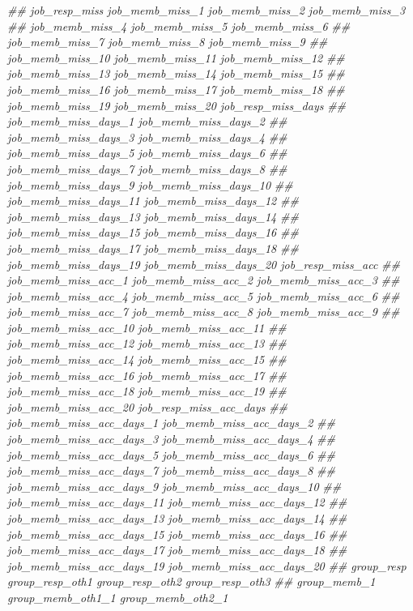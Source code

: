 \documentclass[
]{article}
\newenvironment{Shaded}{\begin{snugshade}}{\end{snugshade}}
\newcommand{\CommentTok}[1]{\textcolor[rgb]{0.56,0.35,0.01}{\textit{#1}}}
\begin{document}
\begin{Shaded}
\begin{Highlighting}[]
\CommentTok{##      job_resp_miss job_memb_miss_1 job_memb_miss_2 job_memb_miss_3}
\CommentTok{##      job_memb_miss_4 job_memb_miss_5 job_memb_miss_6}
\CommentTok{##      job_memb_miss_7 job_memb_miss_8 job_memb_miss_9}
\CommentTok{##      job_memb_miss_10 job_memb_miss_11 job_memb_miss_12}
\CommentTok{##      job_memb_miss_13 job_memb_miss_14 job_memb_miss_15}
\CommentTok{##      job_memb_miss_16 job_memb_miss_17 job_memb_miss_18}
\CommentTok{##      job_memb_miss_19 job_memb_miss_20 job_resp_miss_days}
\CommentTok{##      job_memb_miss_days_1 job_memb_miss_days_2}
\CommentTok{##      job_memb_miss_days_3 job_memb_miss_days_4}
\CommentTok{##      job_memb_miss_days_5 job_memb_miss_days_6}
\CommentTok{##      job_memb_miss_days_7 job_memb_miss_days_8}
\CommentTok{##      job_memb_miss_days_9 job_memb_miss_days_10}
\CommentTok{##      job_memb_miss_days_11 job_memb_miss_days_12}
\CommentTok{##      job_memb_miss_days_13 job_memb_miss_days_14}
\CommentTok{##      job_memb_miss_days_15 job_memb_miss_days_16}
\CommentTok{##      job_memb_miss_days_17 job_memb_miss_days_18}
\CommentTok{##      job_memb_miss_days_19 job_memb_miss_days_20 job_resp_miss_acc}
\CommentTok{##      job_memb_miss_acc_1 job_memb_miss_acc_2 job_memb_miss_acc_3}
\CommentTok{##      job_memb_miss_acc_4 job_memb_miss_acc_5 job_memb_miss_acc_6}
\CommentTok{##      job_memb_miss_acc_7 job_memb_miss_acc_8 job_memb_miss_acc_9}
\CommentTok{##      job_memb_miss_acc_10 job_memb_miss_acc_11}
\CommentTok{##      job_memb_miss_acc_12 job_memb_miss_acc_13}
\CommentTok{##      job_memb_miss_acc_14 job_memb_miss_acc_15}
\CommentTok{##      job_memb_miss_acc_16 job_memb_miss_acc_17}
\CommentTok{##      job_memb_miss_acc_18 job_memb_miss_acc_19}
\CommentTok{##      job_memb_miss_acc_20 job_resp_miss_acc_days}
\CommentTok{##      job_memb_miss_acc_days_1 job_memb_miss_acc_days_2}
\CommentTok{##      job_memb_miss_acc_days_3 job_memb_miss_acc_days_4}
\CommentTok{##      job_memb_miss_acc_days_5 job_memb_miss_acc_days_6}
\CommentTok{##      job_memb_miss_acc_days_7 job_memb_miss_acc_days_8}
\CommentTok{##      job_memb_miss_acc_days_9 job_memb_miss_acc_days_10}
\CommentTok{##      job_memb_miss_acc_days_11 job_memb_miss_acc_days_12}
\CommentTok{##      job_memb_miss_acc_days_13 job_memb_miss_acc_days_14}
\CommentTok{##      job_memb_miss_acc_days_15 job_memb_miss_acc_days_16}
\CommentTok{##      job_memb_miss_acc_days_17 job_memb_miss_acc_days_18}
\CommentTok{##      job_memb_miss_acc_days_19 job_memb_miss_acc_days_20}
\CommentTok{##      group_resp group_resp_oth1 group_resp_oth2 group_resp_oth3}
\CommentTok{##      group_memb_1 group_memb_oth1_1 group_memb_oth2_1}

\end{Highlighting}
\end{Shaded}
\end{document}
